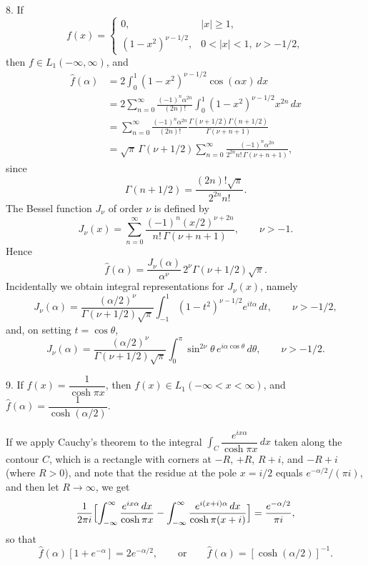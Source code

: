8. If
\begin{equation*}
f(x)=
\begin{cases}
0,&|x|\ge 1,\\
(1-x^2)^{\nu-1/2},&0<|x|<1,\ \nu>-1/2,
\end{cases}
\end{equation*}
then $f\in L_1(-\infty,\infty)$, and
\begin{align*}
\hat f(\alpha)&=2\int_0^1(1-x^2)^{\nu-1/2}\cos(\alpha x)\,dx\\
&=2\sum_{n=0}^\infty\frac{(-1)^n\alpha^{2n}}{(2n)!}\int_0^1(1-x^2)^{\nu-1/2}x^{2n}\,dx\\
&=\sum_{n=0}^\infty\frac{(-1)^n\alpha^{2n}}{(2n)!}\frac{\Gamma(\nu+1/2)\Gamma(n+1/2)}{\Gamma(\nu+n+1)}\\
&=\sqrt\pi\,\Gamma(\nu+1/2)\sum_{n=0}^\infty\frac{(-1)^n\alpha^{2n}}{2^{2n}n!\,\Gamma(\nu+n+1)},
\end{align*}
since
\begin{equation*}
\Gamma(n+1/2)=\frac{(2n)!\sqrt\pi}{2^{2n}n!}.
\end{equation*}
The Bessel function $J_\nu$ of order $\nu$ is defined by
\begin{equation*}
J_\nu(x)=\sum_{n=0}^\infty\frac{(-1)^n(x/2)^{\nu+2n}}{n!\,\Gamma(\nu+n+1)},
\qquad\nu>-1.
\end{equation*}
Hence
\begin{equation*}
\hat f(\alpha)=\frac{J_\nu(\alpha)}{\alpha^\nu}\,2^\nu\Gamma(\nu+1/2)\sqrt\pi.
\end{equation*}
Incidentally we obtain integral representations for $J_\nu(x)$, namely
\begin{equation*}
J_\nu(\alpha)=\frac{(\alpha/2)^\nu}{\Gamma(\nu+1/2)\sqrt\pi}
\int_{-1}^1(1-t^2)^{\nu-1/2}e^{it\alpha}\,dt,
\qquad\nu>-1/2,
\end{equation*}
and, on setting $t=\cos\theta$,
\begin{equation*}
J_\nu(\alpha)=\frac{(\alpha/2)^\nu}{\Gamma(\nu+1/2)\sqrt\pi}
\int_0^\pi\sin^{2\nu}\theta\,e^{i\alpha\cos\theta}\,d\theta,
\qquad\nu>-1/2.
\end{equation*}

9. If $f(x)=\dfrac{1}{\cosh\pi x}$, then $f(x)\in L_1(-\infty<x<\infty)$, and $\widehat f(\alpha)=\dfrac{1}{\cosh(\alpha/2)}$.

If we apply Cauchy's theorem to the integral $\int_C \dfrac{e^{ix\alpha}}{\cosh\pi x}\,dx$ taken along the contour $C$, which is a rectangle with corners at $-R$, $+R$, $R+i$, and $-R+i$ (where $R>0$), and note that the residue at the pole $x=i/2$ equals $e^{-\alpha/2}/(\pi i)$, and then let $R\to\infty$, we get
\begin{equation*}
\frac{1}{2\pi i}\Bigl[\int_{-\infty}^{\infty}\frac{e^{ix\alpha}\,dx}{\cosh\pi x}
-\int_{-\infty}^{\infty}\frac{e^{i(x+i)\alpha}\,dx}{\cosh\pi(x+i)}\Bigr]
=\frac{e^{-\alpha/2}}{\pi i},
\end{equation*}
so that
\begin{equation*}
\hat f(\alpha)[1+e^{-\alpha}]=2e^{-\alpha/2},
\qquad\text{or}\qquad
\hat f(\alpha)=[\cosh(\alpha/2)]^{-1}.
\end{equation*}

